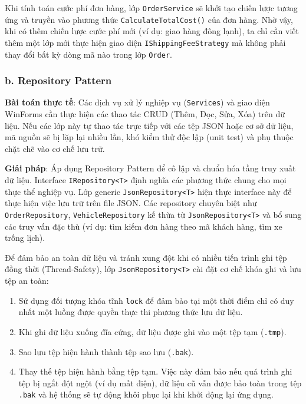 \documentclass[12pt,a4paper]{article}
\begin{document}
Khi tính toán cước phí đơn hàng, lớp \texttt{OrderService} sẽ khởi tạo chiến lược tương ứng và truyền vào phương thức \texttt{CalculateTotalCost()} của đơn hàng. Nhờ vậy, khi có thêm chiến lược cước phí mới (ví dụ: giao hàng đông lạnh), ta chỉ cần viết thêm một lớp mới thực hiện giao diện \texttt{IShippingFeeStrategy} mà không phải thay đổi bất kỳ dòng mã nào trong lớp \texttt{Order}.

\subsubsection*{b. Repository Pattern}

\textbf{Bài toán thực tế}: Các dịch vụ xử lý nghiệp vụ (\texttt{Services}) và giao diện WinForms cần thực hiện các thao tác CRUD (Thêm, Đọc, Sửa, Xóa) trên dữ liệu. Nếu các lớp này tự thao tác trực tiếp với các tệp JSON hoặc cơ sở dữ liệu, mã nguồn sẽ bị lặp lại nhiều lần, khó kiểm thử độc lập (unit test) và phụ thuộc chặt chẽ vào cơ chế lưu trữ.

\textbf{Giải pháp}: Áp dụng Repository Pattern để cô lập và chuẩn hóa tầng truy xuất dữ liệu. Interface \texttt{IRepository<T>} định nghĩa các phương thức chung cho mọi thực thể nghiệp vụ. Lớp generic \texttt{JsonRepository<T>} hiện thực interface này để thực hiện việc lưu trữ trên file JSON. Các repository chuyên biệt như \texttt{OrderRepository}, \texttt{VehicleRepository} kế thừa từ \texttt{JsonRepository<T>} và bổ sung các truy vấn đặc thù (ví dụ: tìm kiếm đơn hàng theo mã khách hàng, tìm xe trống lịch).

Để đảm bảo an toàn dữ liệu và tránh xung đột khi có nhiều tiến trình ghi tệp đồng thời (Thread-Safety), lớp \texttt{JsonRepository<T>} cài đặt cơ chế khóa ghi và lưu tệp an toàn:
\begin{enumerate}[label=\arabic*.]
    \item Sử dụng đối tượng khóa tĩnh \texttt{lock} để đảm bảo tại một thời điểm chỉ có duy nhất một luồng được quyền thực thi phương thức lưu dữ liệu.
    \item Khi ghi dữ liệu xuống đĩa cứng, dữ liệu được ghi vào một tệp tạm (\texttt{.tmp}).
    \item Sao lưu tệp hiện hành thành tệp sao lưu (\texttt{.bak}).
    \item Thay thế tệp hiện hành bằng tệp tạm. Việc này đảm bảo nếu quá trình ghi tệp bị ngắt đột ngột (ví dụ mất điện), dữ liệu cũ vẫn được bảo toàn trong tệp \texttt{.bak} và hệ thống sẽ tự động khôi phục lại khi khởi động lại ứng dụng.
\end{enumerate}
\end{document}

